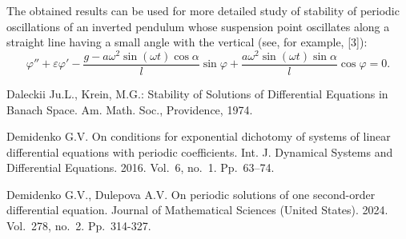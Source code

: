 \documentclass[12pt]{llncs}
\begin{document}
The obtained results can be used for more detailed study of stability of 
periodic oscillations of an inverted pendulum whose suspension point oscillates
along a straight line having a small angle with the vertical (see, for example, [3]): 
$$
\varphi'' + \varepsilon \varphi' - \frac{g - a \omega^2 \sin (\omega t) \cos \alpha}{l} \sin \varphi 
+ \frac{a \omega^2 \sin (\omega t) \sin \alpha}{l} \cos \varphi = 0.
$$		
	
\begin{thebibliography}{9} %

Daleckii Ju.L., Krein, M.G.:
Stability of Solutions of Differential Equations in Banach Space.
Am. Math. Soc., Providence, 1974.

Demidenko G.V. On conditions for exponential dichotomy 
of systems of linear differential equations with periodic coefficients.  
Int. J. Dynamical Systems and Differential Equations. 2016. Vol.~6, no.~1. Pp.~63--74.  

Demidenko G.V., Dulepova A.V. On periodic solutions of one second-order 
differential equation. Journal of Mathematical Sciences (United States). 2024. Vol.~278, 
no.~2. Pp.~314-327.

\end{thebibliography}

\end{document}
